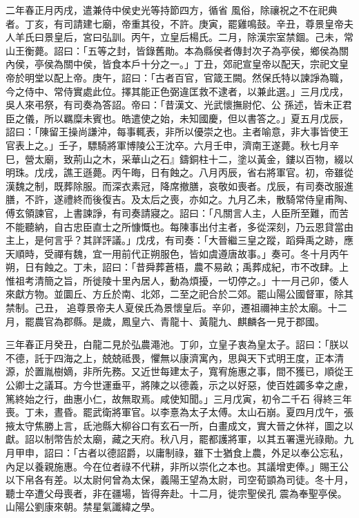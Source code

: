\begin{pinyinscope}
 二年春正月丙戌，遣兼侍中侯史光等持節四方，循省
 風俗，除禳祝之不在祀典者。丁亥，有司請建七廟，帝重其役，不許。庚寅，罷雞鳴鼓。辛丑，尊景皇帝夫人羊氏曰景皇后，宮曰弘訓。丙午，立皇后楊氏。二月，除漢宗室禁錮。己未，常山王衡薨。詔曰：「五等之封，皆錄舊勛。本為縣侯者傳封次子為亭侯，鄉侯為關內侯，亭侯為關中侯，皆食本戶十分之一。」丁丑，郊祀宣皇帝以配天，宗祀文皇帝於明堂以配上帝。庚午，詔曰：「古者百官，官箴王闕。然保氏特以諫諍為職，今之侍中、常侍實處此位。擇其能正色弼違匡救不逮者，以兼此選。」三月戊戌，吳人來弔祭，有司奏為答詔。帝曰：「昔漢文、光武懷撫尉佗、公
 孫述，皆未正君臣之儀，所以羈糜未賓也。皓遣使之始，未知國慶，但以書答之。」夏五月戊辰，詔曰：「陳留王操尚謙沖，每事輒表，非所以優崇之也。主者喻意，非大事皆使王官表上之。」壬子，驃騎將軍博陵公王沈卒。六月壬申，濟南王遂薨。秋七月辛巳，營太廟，致荊山之木，采華山之石』鑄銅柱十二，塗以黃金，鏤以百物，綴以明珠。戊戌，譙王遜薨。丙午晦，日有蝕之。八月丙辰，省右將軍官。初，帝雖從漢魏之制，既葬除服。而深衣素冠，降席撤膳，哀敬如喪者。戊辰，有司奏改服進膳，不許，遂禮終而後復吉。及太后之喪，亦如之。九月乙未，散騎常侍皇甫陶、
 傅玄領諫官，上書諫諍，有司奏請寢之。詔曰：「凡關言人主，人臣所至難，而苦不能聽納，自古忠臣直士之所慷慨也。每陳事出付主者，多從深刻，乃云恩貸當由主上，是何言乎？其詳評議。」戊戌，有司奏：「大晉繼三皇之蹤，蹈舜禹之跡，應天順時，受禪有魏，宜一用前代正朔服色，皆如虞遵唐故事。」奏可。冬十月丙午朔，日有蝕之。丁未，詔曰：「昔舜葬蒼梧，農不易畝；禹葬成紀，市不改肆。上惟祖考清簡之旨，所徙陵十里內居人，動為煩擾，一切停之。」十一月己卯，倭人來獻方物。並圜丘、方丘於南、北郊，二至之祀合於二郊。罷山陽公國督軍，除其禁制。己丑，
 追尊景帝夫人夏侯氏為景懷皇后。辛卯，遷祖禰神主於太廟。十二月，罷農官為郡縣。是歲，鳳皇六、青龍十、黃龍九、麒麟各一見于郡國。



 三年春正月癸丑，白龍二見於弘農澠池。丁卯，立皇子衷為皇太子。詔曰：「朕以不德，託于四海之上，兢兢祗畏，懼無以康濟寓內，思與天下式明王度，正本清源，於置胤樹嫡，非所先務。又近世每建太子，寬宥施惠之事，間不獲已，順從王公卿士之議耳。方今世運垂平，將陳之以德義，示之以好惡，使百姓蠲多幸之慮，篤終始之行，曲惠小仁，故無取焉。咸使知聞。」三月戊寅，初令二千石
 得終三年喪。丁未，晝昏。罷武衛將軍官。以李憙為太子太傅。太山石崩。夏四月戊午，張掖太守焦勝上言，氐池縣大柳谷口有玄石一所，白畫成文，實大晉之休祥，圖之以獻。詔以制幣告於太廟，藏之天府。秋八月，罷都護將軍，以其五署還光祿勛。九月甲申，詔曰：「古者以德詔爵，以庸制祿，雖下士猶食上農，外足以奉公忘私，內足以養親施惠。今在位者祿不代耕，非所以崇化之本也。其議增吏俸。」賜王公以下帛各有差。以太尉何曾為太保，義陽王望為太尉，司空荀顗為司徒。冬十月，聽士卒遭父母喪者，非在疆場，皆得奔赴。十二月，徙宗聖侯孔
 震為奉聖亭侯。山陽公劉康來朝。禁星氣讖緯之學。




\end{pinyinscope}
